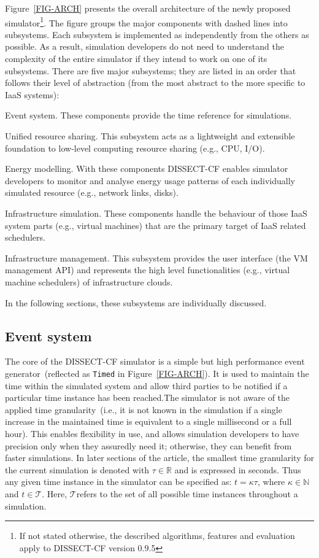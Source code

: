 \documentclass[sort, compress, 5p]{elsarticle}
\newcommand{\SMALLESTIMEGRANULARITYM}{\tau}
\newcommand{\SIMULATIONTIMEM}{\mathcal{T}}
\newcommand{\SIMULATIONTIME}{$\SIMULATIONTIMEM$}
\begin{document}
Figure~\ref{FIG-ARCH} presents the overall architecture of the newly proposed simulator\footnote{If not stated otherwise, the described algorithms, features and evaluation apply to DISSECT-CF version 0.9.5}. The figure groups the major components with dashed lines into subsystems. Each subsystem is implemented as independently from the others as possible.  As a result, simulation developers do not need to understand the complexity of the entire simulator if they intend to work on one of its subsystems. There are five major subsystems; they are listed in an order that follows their level of abstraction (from the most abstract to the more specific to IaaS systems):
\begin{description*}
\item[Event system.] These components provide the time reference for simulations.
\item[Unified resource sharing.]  \sloppy This subsystem acts as a lightweight and extensible foundation to low-level computing resource sharing (e.g., CPU, I/O).
\item[Energy modelling.] With these components DISSECT-CF enables simulator developers to monitor and analyse energy usage patterns of each individually simulated resource (e.g., network links, disks).
\item[Infrastructure simulation.] These components handle the behaviour of those IaaS system parts (e.g., virtual machines) that are the primary target of IaaS related schedulers.
\item[Infrastructure management.] This subsystem provides the user interface (the VM management API) and represents the high level functionalities (e.g., virtual machine schedulers) of infrastructure clouds.
\end{description*}
In the following sections, these subsystems are individually discussed.

\subsection{Event system}

The core of the DISSECT-CF simulator is a simple but high performance event generator~(reflected as \verb+Timed+ in Figure~\ref{FIG-ARCH}). It is used to maintain the time within the simulated system and allow third parties to be notified if a particular time instance has been reached.The simulator is not aware of the applied time granularity~(i.e., it is not known in the simulation if a single increase in the maintained time is equivalent to a single millisecond or a full hour). This enables flexibility in use, and allows simulation developers to have precision only when they assuredly need it; otherwise, they can benefit from faster simulations. In later sections of the article, the smallest time granularity for the current simulation is denoted with $\SMALLESTIMEGRANULARITYM\in\mathbb{R}$ and is expressed in seconds. Thus any given time instance in the simulator can be specified as: $t = \kappa\SMALLESTIMEGRANULARITYM$, where $\kappa\in\mathbb{N}$ and $t\in\SIMULATIONTIMEM$. Here, \SIMULATIONTIME refers to the set of all possible time instances throughout a simulation.
\end{document}
